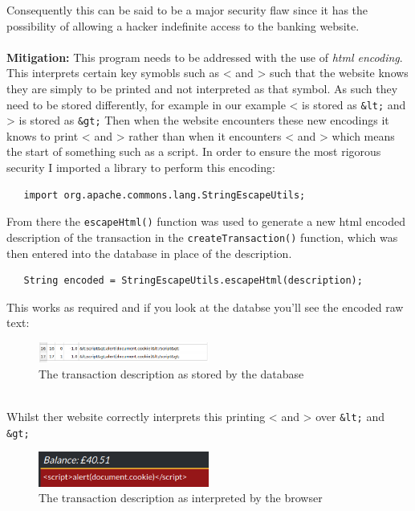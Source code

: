 Consequently this can be said to be a major security flaw since it has the possibility of allowing a hacker indefinite access to the banking website.\\ \\
\textbf{Mitigation:} This program needs to be addressed with the use of \textit{html encoding}. This interprets certain key symobls such as < and > such that the website knows
they are simply to be printed and not interpreted as that symbol. As such they need to be stored differently, for example in our example < is stored as \verb|&lt;| and > is stored as
\verb|&gt;| Then when the website encounters these new encodings it knows to print < and > rather than when it encounters < and > which means the start of something such as a
script. In order to ensure the most rigorous security I imported a library to perform this encoding:
\begin{verbatim}
   import org.apache.commons.lang.StringEscapeUtils;
\end{verbatim}
From there the \verb|escapeHtml()| function was used to generate a new html encoded description of the transaction in the \verb|createTransaction()| function, which was then
entered into the database in place of the description.
\begin{verbatim}
   String encoded = StringEscapeUtils.escapeHtml(description);
\end{verbatim}
This works as required and if you look at the databse you'll see the encoded raw text:
\begin{figure}[h]
   \centering
   \includegraphics[width=0.5\textwidth]{figs/database.png}
   \caption{The transaction description as stored by the database}
   \label{fig2}
\end{figure}\\
Whilst ther website correctly interprets this printing < and > over \verb|&lt;| and \verb|&gt;|
\begin{figure}[h]
   \centering
   \includegraphics[width=0.5\textwidth]{figs/websitejs.png}
   \caption{The transaction description as interpreted by the browser}
   \label{fig3}
\end{figure}\\

 
